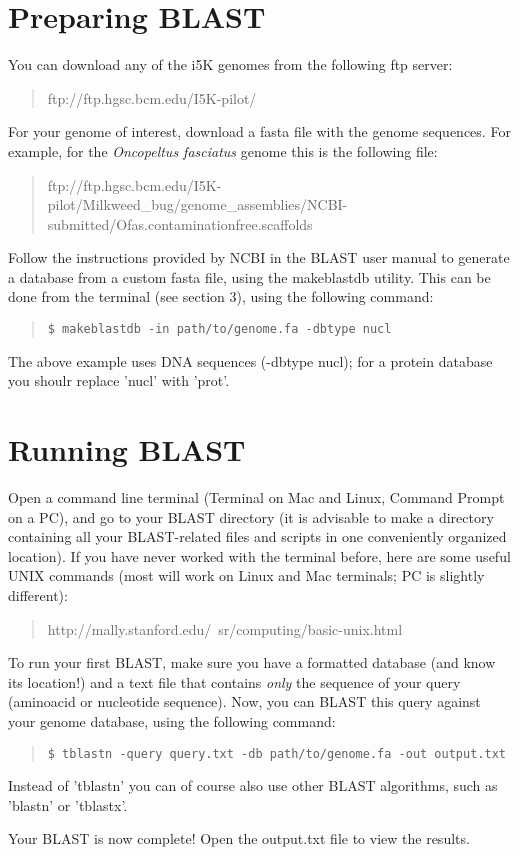 \documentclass[12pt]{article}
\begin{document}
\section{Preparing BLAST}
You can download any of the i5K genomes from the following ftp server:
\begin{quote}
ftp://ftp.hgsc.bcm.edu/I5K-pilot/
\end{quote}
For your genome of interest, download a fasta file with the genome sequences. For example, for the \textit{Oncopeltus fasciatus} genome this is the following file:
\begin{quote}{ftp://ftp.hgsc.bcm.edu/I5K-pilot/Milkweed\_bug/genome\_assemblies/NCBI-submitted/Ofas.contaminationfree.scaffolds}
\end{quote}
Follow the instructions provided by NCBI in the BLAST user manual to generate a database from a custom fasta file, using the makeblastdb utility. This can be done from the terminal (see section 3), using the following command:
\begin{quote}
\begin{verbatim}
$ makeblastdb -in path/to/genome.fa -dbtype nucl
\end{verbatim}
\end{quote}
The above example uses DNA sequences (-dbtype nucl); for a protein database you shoulr replace 'nucl' with 'prot'.
\section{Running BLAST}
Open a command line terminal (Terminal on Mac and Linux, Command Prompt on a PC), and go to your BLAST directory (it is advisable to make a directory containing all your BLAST-related files and scripts in one conveniently organized location). If you have never worked with the terminal before, here are some useful UNIX commands (most will work on Linux and Mac terminals; PC is slightly different):
\begin{quote}
http://mally.stanford.edu/~sr/computing/basic-unix.html
\end{quote}
To run your first BLAST, make sure you have a formatted database (and know its location!) and a text file that contains \textit{only} the sequence of your query (aminoacid or nucleotide sequence). Now, you can BLAST this query against your genome database, using the following command:
\begin{quote}
\begin{verbatim}
$ tblastn -query query.txt -db path/to/genome.fa -out output.txt
\end{verbatim}
\end{quote}
Instead of 'tblastn' you can of course also use other BLAST algorithms, such as 'blastn' or 'tblastx'.\par
Your BLAST is now complete! Open the output.txt file to view the results.
\end{document}
